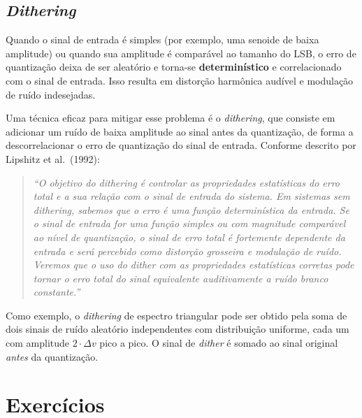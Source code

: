 \documentclass[a4paper,twoside,12pt]{article}
\begin{document}
	\subsection{\textit{Dithering}}
	
	Quando o sinal de entrada é simples (por exemplo, uma senoide de baixa amplitude) ou quando sua amplitude é comparável ao tamanho do LSB, o erro de quantização deixa de ser aleatório e torna-se \textbf{determinístico} e correlacionado com o sinal de entrada. Isso resulta em distorção harmônica audível e modulação de ruído indesejadas.
	
	Uma técnica eficaz para mitigar esse problema é o \textit{dithering}, que consiste em adicionar um ruído de baixa amplitude ao sinal antes da quantização, de forma a descorrelacionar o erro de quantização do sinal de entrada. Conforme descrito por Lipshitz et al.\ (1992):
	
	\begin{quote}
		\textit{``O objetivo do dithering é controlar as propriedades estatísticas do erro total e a sua relação com o sinal de entrada do sistema. Em sistemas sem dithering, sabemos que o erro é uma função determinística da entrada. Se o sinal de entrada for uma função simples ou com magnitude comparável ao nível de quantização, o sinal de erro total é fortemente dependente da entrada e será percebido como distorção grosseira e modulação de ruído. Veremos que o uso do dither com as propriedades estatísticas corretas pode tornar o erro total do sinal equivalente auditivamente a ruído branco constante.''}
	\end{quote}
	
	Como exemplo, o \textit{dithering} de espectro triangular pode ser obtido pela soma de dois sinais de ruído aleatório independentes com distribuição uniforme, cada um com amplitude $2 \cdot \Delta v$ pico a pico. O sinal de \textit{dither} é somado ao sinal original \textit{antes} da quantização.

	
	\section{Exercícios}
	
\end{document}
